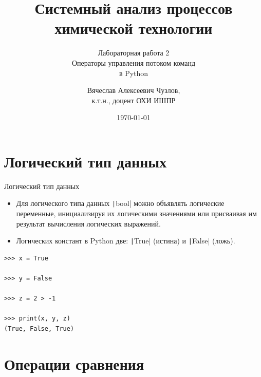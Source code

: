 \documentclass[aspectratio=169, mathserif]{beamer}	%
\title{\LARGE{Системный анализ процессов химической технологии}}
\subtitle{Лабораторная работа 2 \\ Операторы управления потоком команд \\ в Python}
\author[]{Вячеслав Алексеевич Чузлов, \\
	к.т.н., доцент ОХИ ИШПР}
\date{\today}
\begin{document}

\titleframe		%

\tocframe{}		%



\section{Логический тип данных}
\sectionframe


\begin{frame}[fragile]{Логический тип данных}
\scriptsize
\begin{itemize}

\item Для логического типа данных \texttt|bool| можно объявлять логические переменные, инициализируя их логическими значениями или присваивая им результат вычисления логических выражений.

\item Логических констант в Python две: \texttt|True| (истина) и \texttt|False| (ложь).
\end{itemize}

\begin{verbatim}
>>> x = True

>>> y = False

>>> z = 2 > -1

>>> print(x, y, z)
(True, False, True)
\end{verbatim}

\vfill
\end{frame}


\section{Операции сравнения}
\sectionframe
\end{document}
